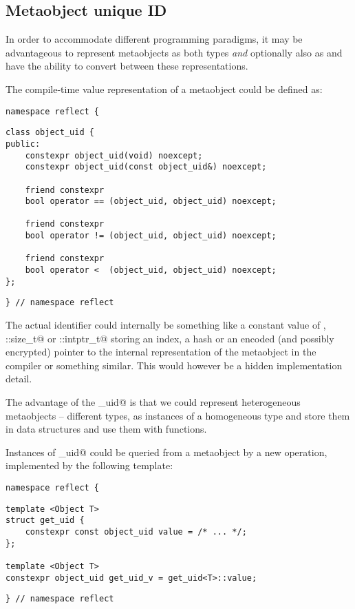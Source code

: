 \subsection{Metaobject unique ID}
\label{fut-metaobject-uid}

In order to accommodate different programming paradigms, it may be advantageous
to represent metaobjects as both types {\em and} optionally also as
 and have the ability to convert between these
representations.

The compile-time value representation of a metaobject could be defined as:

\begin{verbatim}
namespace reflect {
\end{verbatim}
\begin{verbatim}
class object_uid {
public:
	constexpr object_uid(void) noexcept;
	constexpr object_uid(const object_uid&) noexcept;

	friend constexpr
	bool operator == (object_uid, object_uid) noexcept;

	friend constexpr
	bool operator != (object_uid, object_uid) noexcept;

	friend constexpr
	bool operator <  (object_uid, object_uid) noexcept;
};
\end{verbatim}
\begin{verbatim}
} // namespace reflect
\end{verbatim}

The actual identifier could internally be something like a constant value of
\verb@int@, \verb@std::size_t@ or \verb@std::intptr_t@ storing an index, a hash
or an encoded (and possibly encrypted) pointer to the internal representation
of the metaobject in the compiler or something similar.
This would however be a hidden implementation detail.

The advantage of the \verb@object_uid@ is that we could represent heterogeneous
metaobjects -- different types, as \verb@constexpr@ instances of a homogeneous
type and store them in \verb@constexpr@ data structures and use them with
\verb@constexpr@ functions.

Instances of \verb@object_uid@ could be queried from a metaobject by a new
operation, implemented by the following template:

\begin{verbatim}
namespace reflect {
\end{verbatim}
\begin{verbatim}
template <Object T>
struct get_uid {
	constexpr const object_uid value = /* ... */;
};

template <Object T>
constexpr object_uid get_uid_v = get_uid<T>::value;
\end{verbatim}
\begin{verbatim}
} // namespace reflect
\end{verbatim}

